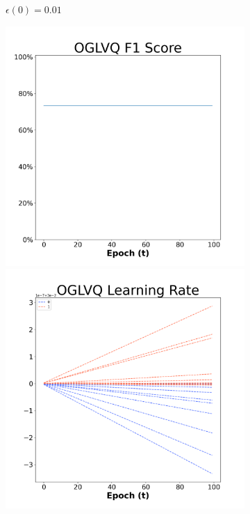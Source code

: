 \begin{figure}[H]
\begin{subfigure}{0.3\textwidth}
  \caption{$\epsilon(0)=0.01$}
\end{subfigure}\hfil %
\begin{subfigure}{0.3\textwidth}
  \includegraphics[width=\linewidth]{images/exper2/SP/OGLVQ_0.03_f1.png}
  \includegraphics[width=\linewidth]{images/exper2/SP/OGLVQ_0.03_lr.png}

\end{subfigure}
\end{figure}
